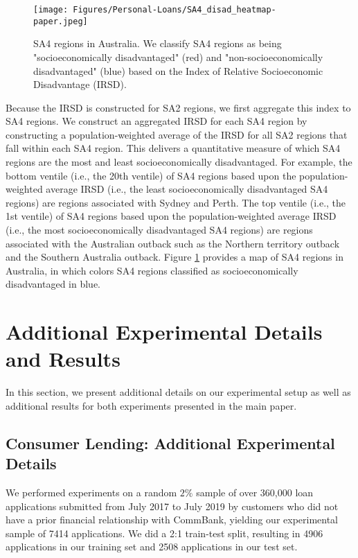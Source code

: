 \documentclass{article}
\begin{document}
\begin{figure}[htbp!]
    \center
    \texttt{[image: Figures/Personal-Loans/SA4\_disad\_heatmap-paper.jpeg]}
    \caption{SA4 regions in Australia. We classify SA4 regions as being "socioeconomically disadvantaged" (red) and "non-socioeconomically disadvantaged" (blue) based on the Index of Relative Socioeconomic Disadvantage (IRSD). }
    \label{fig: map of SA4 and IRSD}
\end{figure}

Because the IRSD is constructed for SA2 regions, we first aggregate this index to SA4 regions. We construct an aggregated IRSD for each SA4 region by constructing a population-weighted average of the IRSD for all SA2 regions that fall within each SA4 region. This delivers a quantitative measure of which SA4 regions are the most and least socioeconomically disadvantaged. For example, the bottom ventile (i.e., the 20th ventile) of SA4 regions based upon the population-weighted average IRSD (i.e., the least socioeconomically disadvantaged SA4 regions) are regions associated with Sydney and Perth. The top ventile (i.e., the 1st ventile) of SA4 regions based upon the population-weighted average IRSD (i.e., the most socioeconomically disadvantaged SA4 regions) are regions associated with the Australian outback such as the Northern territory outback and the Southern Australia outback. Figure \ref{fig: map of SA4 and IRSD} provides a map of SA4 regions in Australia, in which colors SA4 regions classified as socioeconomically disadvantaged in blue.

\section{Additional Experimental Details and Results}\label{section: additional experiments}

In this section, we present additional details on our experimental setup as well as additional results for both experiments presented in the main paper.

\subsection{Consumer Lending: Additional Experimental Details} \label{section: experimental details} %

We performed experiments on a random $2\%$ sample of over 360,000 loan applications submitted from July 2017 to July 2019 by customers who did not have a prior financial relationship with CommBank, yielding our experimental sample of 7414 applications. We did a 2:1 train-test split, resulting in 4906 applications in our training set and 2508 applications in our test set. 
\end{document}
